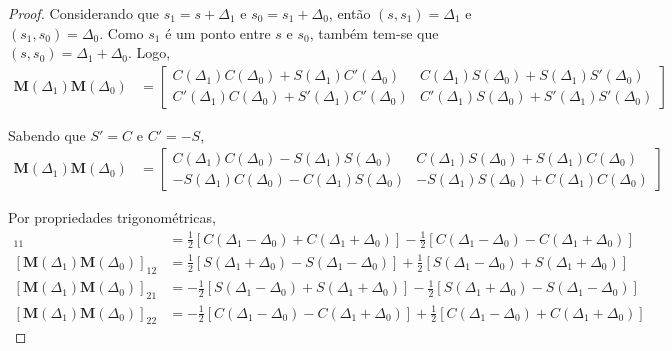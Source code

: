 \begin{proof}
	Considerando que $s_1 = s+\Delta_1$ e $s_0 = s_1 + \Delta_0$, então $(s,s_1) = \Delta_1$ e $(s_1,s_0) = \Delta_0$. Como $s_1$ é um ponto entre $s$ e $s_0$, também tem-se que $(s,s_0) = \Delta_1 + \Delta_0$. Logo, 
	\begin{align*}
        \boldsymbol{M}(\Delta_1)\boldsymbol{M}(\Delta_0) &= \begin{bmatrix}
        C(\Delta_1)C(\Delta_0)+S(\Delta_1)C'(\Delta_0) & C(\Delta_1)S(\Delta_0) + S(\Delta_1)S'(\Delta_0)\\
        C'(\Delta_1)C(\Delta_0)+S'(\Delta_1)C'(\Delta_0) & C'(\Delta_1)S(\Delta_0) + S'(\Delta_1)S'(\Delta_0)
        \end{bmatrix}
	\end{align*}
	
	Sabendo que $S'=C$ e $C'=-S$,
	\begin{align*}
        \boldsymbol{M}(\Delta_1)\boldsymbol{M}(\Delta_0) &= \begin{bmatrix}
        C(\Delta_1)C(\Delta_0)-S(\Delta_1)S(\Delta_0) & C(\Delta_1)S(\Delta_0) + S(\Delta_1)C(\Delta_0)\\
        -S(\Delta_1)C(\Delta_0)-C(\Delta_1)S(\Delta_0) & -S(\Delta_1)S(\Delta_0) + C(\Delta_1)C(\Delta_0)
        \end{bmatrix}
	\end{align*}
	
	Por propriedades trigonométricas,
	\begin{align*}
        [\boldsymbol{M}(\Delta_1)\boldsymbol{M}(\Delta_0)]_{11} &= \frac{1}{2}[C(\Delta_1-\Delta_0)+C(\Delta_1+\Delta_0)] - \frac{1}{2}[C(\Delta_1-\Delta_0)-C(\Delta_1+\Delta_0)]\\
        [\boldsymbol{M}(\Delta_1)\boldsymbol{M}(\Delta_0)]_{12} &= \frac{1}{2}[S(\Delta_1+\Delta_0)-S(\Delta_1-\Delta_0)] + \frac{1}{2}[S(\Delta_1-\Delta_0)+S(\Delta_1+\Delta_0)]\\
        [\boldsymbol{M}(\Delta_1)\boldsymbol{M}(\Delta_0)]_{21} &= -\frac{1}{2}[S(\Delta_1-\Delta_0)+S(\Delta_1+\Delta_0)] - \frac{1}{2}[S(\Delta_1+\Delta_0)-S(\Delta_1-\Delta_0)]\\
        [\boldsymbol{M}(\Delta_1)\boldsymbol{M}(\Delta_0)]_{22} &= -\frac{1}{2}[C(\Delta_1-\Delta_0)-C(\Delta_1+\Delta_0)] + \frac{1}{2}[C(\Delta_1-\Delta_0)+C(\Delta_1+\Delta_0)]
	\end{align*}
	

\end{proof}
